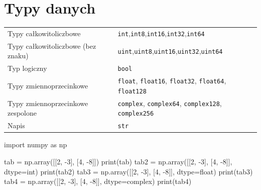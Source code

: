 \documentclass[
  letterpaper,
  DIV=11,
  numbers=noendperiod]{scrreprt}
\newenvironment{Shaded}{\begin{snugshade}}{\end{snugshade}}
\newcommand{\BuiltInTok}[1]{\textcolor[rgb]{0.00,0.23,0.31}{#1}}
\newcommand{\DecValTok}[1]{\textcolor[rgb]{0.68,0.00,0.00}{#1}}
\newcommand{\ImportTok}[1]{\textcolor[rgb]{0.00,0.46,0.62}{#1}}
\newcommand{\NormalTok}[1]{\textcolor[rgb]{0.00,0.23,0.31}{#1}}
\newcommand{\OperatorTok}[1]{\textcolor[rgb]{0.37,0.37,0.37}{#1}}
\begin{document}
\chapter{Typy danych}\label{typy-danych}

\begin{longtable}[]{@{}
  >{\raggedright\arraybackslash}p{}
  >{\raggedright\arraybackslash}p{}@{}}
\toprule\noalign{}
\endhead
\bottomrule\noalign{}
\endlastfoot
Typy całkowitoliczbowe &
\texttt{int},\texttt{int8},\texttt{int16},\texttt{int32},\texttt{int64} \\
Typy całkowitoliczbowe (bez znaku) &
\texttt{uint},\texttt{uint8},\texttt{uint16},\texttt{uint32},\texttt{uint64} \\
Typ logiczny & \texttt{bool} \\
Typy zmiennoprzecinkowe & \texttt{float}, \texttt{float16},
\texttt{float32}, \texttt{float64}, \texttt{float128} \\
Typy zmiennoprzecinkowe zespolone & \texttt{complex},
\texttt{complex64}, \texttt{complex128}, \texttt{complex256} \\
Napis & \texttt{str} \\
\end{longtable}

\begin{Shaded}
\begin{Highlighting}[]
\ImportTok{import}\NormalTok{ numpy }\ImportTok{as}\NormalTok{ np}

\NormalTok{tab }\OperatorTok{=}\NormalTok{ np.array([[}\DecValTok{2}\NormalTok{, }\OperatorTok{{-}}\DecValTok{3}\NormalTok{], [}\DecValTok{4}\NormalTok{, }\OperatorTok{{-}}\DecValTok{8}\NormalTok{]])}
\BuiltInTok{print}\NormalTok{(tab)}
\NormalTok{tab2 }\OperatorTok{=}\NormalTok{ np.array([[}\DecValTok{2}\NormalTok{, }\OperatorTok{{-}}\DecValTok{3}\NormalTok{], [}\DecValTok{4}\NormalTok{, }\OperatorTok{{-}}\DecValTok{8}\NormalTok{]], dtype}\OperatorTok{=}\BuiltInTok{int}\NormalTok{)}
\BuiltInTok{print}\NormalTok{(tab2)}
\NormalTok{tab3 }\OperatorTok{=}\NormalTok{ np.array([[}\DecValTok{2}\NormalTok{, }\OperatorTok{{-}}\DecValTok{3}\NormalTok{], [}\DecValTok{4}\NormalTok{, }\OperatorTok{{-}}\DecValTok{8}\NormalTok{]], dtype}\OperatorTok{=}\BuiltInTok{float}\NormalTok{)}
\BuiltInTok{print}\NormalTok{(tab3)}
\NormalTok{tab4 }\OperatorTok{=}\NormalTok{ np.array([[}\DecValTok{2}\NormalTok{, }\OperatorTok{{-}}\DecValTok{3}\NormalTok{], [}\DecValTok{4}\NormalTok{, }\OperatorTok{{-}}\DecValTok{8}\NormalTok{]], dtype}\OperatorTok{=}\BuiltInTok{complex}\NormalTok{)}
\BuiltInTok{print}\NormalTok{(tab4)}
\end{Highlighting}
\end{Shaded}
\end{document}
